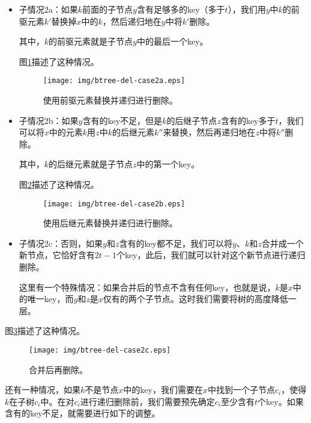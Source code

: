 \documentclass[UTF8]{article}
\begin{document}
\begin{itemize}
\item 子情况2a：如果$k$前面的子节点$y$含有足够多的key（多于$t$），我们用$y$中$k$的前驱元素$k'$替换掉$x$中的$k$，然后递归地在$y$中将$k'$删除。

其中，$k$的前驱元素就是子节点$y$中的最后一个key。

图\ref{fig:btree-del-case2a}描述了这种情况。

\begin{figure}[htbp]
  \centering
    \texttt{[image: img/btree-del-case2a.eps]}
    \caption{使用前驱元素替换并递归进行删除。} \label{fig:btree-del-case2a}
\end{figure}

\item 子情况2b：如果$y$含有的key不足，但是$k$的后继子节点$z$含有的key多于$t$，我们可以将$x$中的元素$k$用$z$中$k$的后继元素$k''$来替换，然后再递归地在$z$中将$k''$删除。

其中，$k$的后继元素就是子节点$z$中的第一个key。

图\ref{fig:btree-del-case2b}描述了这种情况。

\begin{figure}[htbp]
  \centering
    \texttt{[image: img/btree-del-case2b.eps]}
    \caption{使用后继元素替换并递归进行删除。} \label{fig:btree-del-case2b}
\end{figure}

\item 子情况2c：否则，如果$y$和$z$含有的key都不足，我们可以将$y$、$k$和$z$合并成一个新节点，它恰好含有$2t-1$个key，此后，我们就可以针对这个新节点进行递归删除。

这里有一个特殊情况：如果合并后的节点不含有任何key，也就是说，$k$是$x$中的唯一key，而$y$和$z$是$x$仅有的两个子节点。这时我们需要将树的高度降低一层。
\end{itemize}

图\ref{fig:btree-del-case2c}描述了这种情况。

\begin{figure}[htbp]
  \centering
    \texttt{[image: img/btree-del-case2c.eps]}
    \caption{合并后再删除。} \label{fig:btree-del-case2c}
\end{figure}

还有一种情况，如果$k$不是节点$x$中的key，我们需要在$x$中找到一个子节点$c_i$，使得$k$在子树$c_i$中。在对$c_i$进行递归删除前，我们需要预先确定$c_i$至少含有$t$个key。如果含有的key不足，就需要进行如下的调整。
\end{document}
